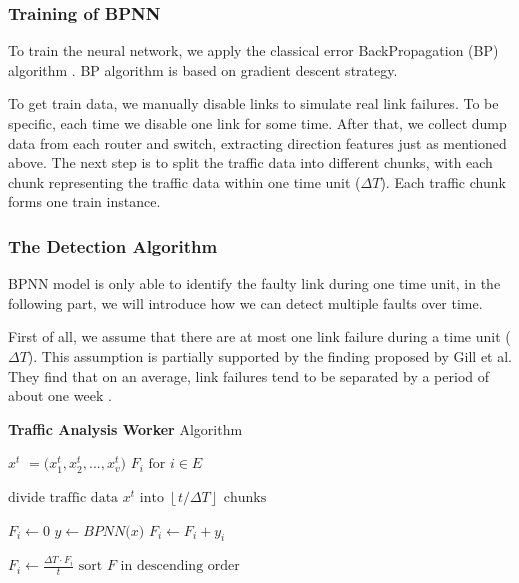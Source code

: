 \documentclass{sig-alternate-05-2015}
\begin{document}
\subsubsection*{Training of BPNN}
\quad To train the neural network, we apply the classical error BackPropagation (BP) algorithm \cite{rumelhart1988learning}. BP algorithm is based on gradient descent strategy.%

To get train data, we manually disable links to simulate real link failures. To be specific, each time we disable one link for some time. After that, we collect dump data from each router and switch, extracting direction features just as mentioned above. The next step is to split the traffic data into different chunks, with each chunk representing the traffic data within one time unit ($\Delta T$). Each traffic chunk forms one train instance.

\subsubsection*{The Detection Algorithm}
\quad BPNN model is only able to identify the faulty link during one time unit, in the following part, we will introduce how we can detect multiple faults over time.

First of all, we assume that there are at most one link failure during a time unit ($\Delta T$). This assumption is partially supported by the finding proposed by Gill et al. They find that on an average, link failures tend to be separated by a period of about one week \cite{gill2011understanding}.

\renewcommand{\algorithmicrequire}{\textbf{Input:}}
\renewcommand{\algorithmicensure}{\textbf{Output:}}
\begin{algorithm}
	\caption{\textbf{Traffic Analysis Worker} Algorithm}
	\begin{algorithmic}[1]
        \REQUIRE \boldmath $x^t$ \unboldmath$=($\boldmath $x_1^t, x_2^t, ..., x_v^t$\unboldmath $)$
		\ENSURE $F_i \text{ for } i \in E$

        \STATE $\text{divide traffic data }$\boldmath $x^t$$\text{ into }$\unboldmath $\left\lfloor t/\Delta T \right\rfloor \text{ chunks}$

            \STATE $F_i \leftarrow 0$
        \ENDFOR
        \STATE \boldmath $y$\unboldmath $\leftarrow BPNN($\boldmath $x$\unboldmath $)$
                \STATE $F_i \leftarrow F_i + y_i$
            \ENDFOR
        \ENDFOR

            \STATE $F_i \leftarrow \frac{\Delta T \cdot F_i}{t}$
        \ENDFOR
        \STATE $\text{sort }$\boldmath $F$\unboldmath$\text{ in descending order}$
	\end{algorithmic}
\end{algorithm}
\end{document}
